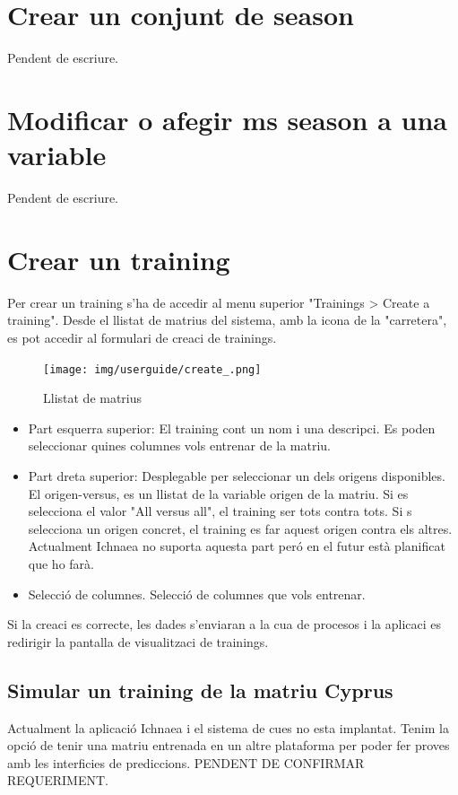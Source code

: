 \section{Crear un conjunt de season}
Pendent de escriure.

\section{Modificar o afegir ms season a una variable}
Pendent de escriure.

\section{Crear un training}
Per crear un training s'ha de accedir al menu superior "Trainings > Create a training". Desde el llistat de matrius del sistema, amb la icona de la "carretera", es pot accedir al formulari de creaci de trainings.
\begin{figure}[h!]
  \centering
  \texttt{[image: img/userguide/create\_.png]}
  \caption{Llistat de matrius}
  \label{fig:placement}
\end{figure}
\begin{itemize}
\item Part esquerra superior: El training cont un nom i una descripci. Es poden seleccionar quines columnes vols entrenar de la matriu. 
\item Part dreta superior: Desplegable per seleccionar un dels origens disponibles.  El origen-versus, es un llistat de la variable origen de la matriu. Si es selecciona el valor "All versus all", el training ser tots contra tots. Si s selecciona un origen concret, el training es far aquest origen contra els altres. Actualment Ichnaea no suporta aquesta part per\'{o} en el futur est\`{a} planificat que ho far\`{a}.
\item Selecci\'{o} de columnes. Selecci\'{o} de columnes que vols entrenar.
\end{itemize}

Si la creaci \´e{s} correcte, les dades s'enviaran a la cua de procesos i la aplicaci es redirigir la pantalla de visualitzaci de trainings.

\subsection{Simular un training de la matriu Cyprus}
Actualment la aplicaci\'{o} Ichnaea i el sistema de cues no esta implantat. Tenim la opci\'{o} de tenir una matriu entrenada en un altre plataforma per poder fer proves amb les interficies de prediccions. PENDENT DE CONFIRMAR REQUERIMENT.

